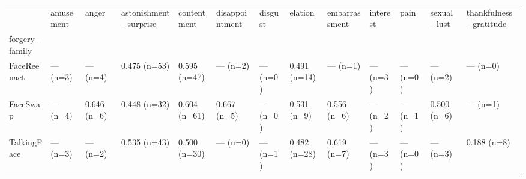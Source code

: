 \begin{tabular}{lllllllllllll}
\toprule
 & amusement & anger & astonishment\_surprise & contentment & disappointment & disgust & elation & embarrassment & interest & pain & sexual\_lust & thankfulness\_gratitude \\
forgery\_family &  &  &  &  &  &  &  &  &  &  &  &  \\
\midrule
FaceReenact & — (n=3) & — (n=4) & 0.475 (n=53) & 0.595 (n=47) & — (n=2) & — (n=0) & 0.491 (n=14) & — (n=1) & — (n=3) & — (n=0) & — (n=2) & — (n=0) \\
FaceSwap & — (n=4) & 0.646 (n=6) & 0.448 (n=32) & 0.604 (n=61) & 0.667 (n=5) & — (n=0) & 0.531 (n=9) & 0.556 (n=6) & — (n=2) & — (n=1) & 0.500 (n=6) & — (n=1) \\
TalkingFace & — (n=3) & — (n=2) & 0.535 (n=43) & 0.500 (n=30) & — (n=0) & — (n=1) & 0.482 (n=28) & 0.619 (n=7) & — (n=3) & — (n=0) & — (n=3) & 0.188 (n=8) \\
\bottomrule
\end{tabular}

